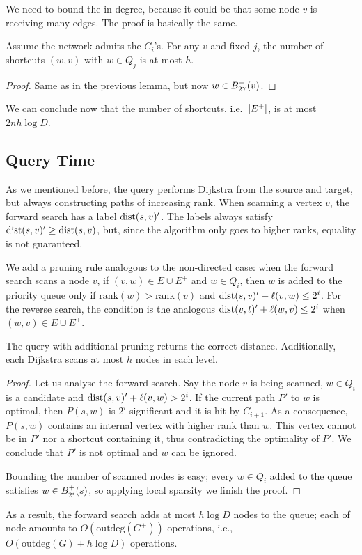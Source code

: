 We need to bound the in-degree, because it could be that some node $v$ is receiving many edges.
The proof is basically the same.
\begin{lemma}
	Assume the network admits the $C_i$'s.
	For any $v$ and fixed $j$, the number of shortcuts $(w,v)$ with $w\in Q_j$ is at most $h$.
\end{lemma}
\begin{proof}
	Same as in the previous lemma, but now $w\in B^-_{2^\gamma}(v)$.
\end{proof}

We can conclude now that the number of shortcuts, i.e.\ $\lvert E^+\rvert$, is at most $2nh\log D$.

\subsection{Query Time}

As we mentioned before, the query performs Dijkstra from the source and target, but always constructing paths of increasing rank.
When scanning a vertex $v$, the forward search has a label $\text{dist}(s,v)'$. 
The labels always satisfy $\text{dist}(s,v)'\geq\text{dist}(s,v)$, but, since the algorithm only goes to higher ranks, equality is not guaranteed.

We add a pruning rule analogous to the non-directed case: when the forward search scans a node $v$, if $(v,w)\in E\cup E^+$ and $w\in Q_i$, then $w$ is added to the priority queue only if $\text{rank}(w)>\text{rank}(v)$ and $\text{dist}(s,v)'+\ell(v,w)\leq 2^i$.
For the reverse search, the condition is the analogous $\text{dist}(v,t)'+\ell(w,v)\leq 2^i$ when $(w,v)\in  E\cup E^+$.

\begin{proposition}
	The query with additional pruning returns the correct distance.
	Additionally, each Dijkstra scans at most $h$ nodes in each level.
\end{proposition}
\begin{proof}
	Let us analyse the forward search.
	Say the node $v$ is being scanned, $w\in Q_i$ is a candidate and $\text{dist}(s,v)'+\ell(v,w)>2^i$.
	If the current path $P'$ to $w$ is optimal, then $P(s,w)$ is $2^i$-significant and it is hit by $C_{i+1}$. 
	As a consequence, $P(s,w)$ contains an internal vertex with higher rank than $w$.
	This vertex cannot be in $P'$ nor a shortcut containing it, thus contradicting the optimality of $P'$.
	We conclude that $P'$ is not optimal and $w$ can be ignored.
	
	Bounding the number of scanned nodes is easy; every $w\in Q_i$ added to the queue satisfies $w\in B^+_{2^i}(s)$, so applying local sparsity we finish the proof.
\end{proof}

As a result, the forward search adds at most $h\log D$ nodes to the queue;
each of node amounts to $O(\text{outdeg} (G^+))$ operations, i.e., $O(\text{outdeg}(G) + h\log D)$ operations.
